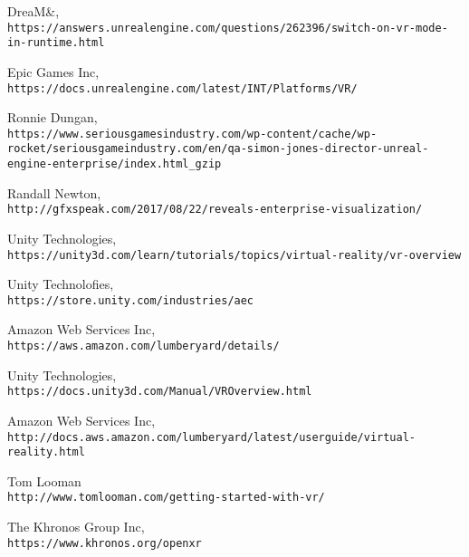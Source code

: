 \documentclass[onecolumn, draftclsnofoot, 10pt, compsoc]{IEEEtran}
\begin{document}
\begin{thebibliography}{9}

DreaM\&\Mer,
\\\texttt{https://answers.unrealengine.com/questions/262396/switch-on-vr-mode-in-runtime.html}

Epic Games Inc,
\\\texttt{https://docs.unrealengine.com/latest/INT/Platforms/VR/}

Ronnie Dungan,
\\\texttt{https://www.seriousgamesindustry.com/wp-content/cache/wp-rocket/seriousgameindustry.com/en/qa-simon-jones-director-unreal-engine-enterprise/index.html_gzip}

Randall Newton,
\\\texttt{http://gfxspeak.com/2017/08/22/reveals-enterprise-visualization/}

Unity Technologies,
\\\texttt{https://unity3d.com/learn/tutorials/topics/virtual-reality/vr-overview}

Unity Technolofies,
\\\texttt{https://store.unity.com/industries/aec}

Amazon Web Services Inc,
\\\texttt{https://aws.amazon.com/lumberyard/details/}

Unity Technologies,
\\\texttt{https://docs.unity3d.com/Manual/VROverview.html}

Amazon Web Services Inc,
\\\texttt{http://docs.aws.amazon.com/lumberyard/latest/userguide/virtual-reality.html}

Tom Looman
\\\texttt{http://www.tomlooman.com/getting-started-with-vr/}

The Khronos Group Inc,
\\\texttt{https://www.khronos.org/openxr}

\end{thebibliography}

\end{document}
